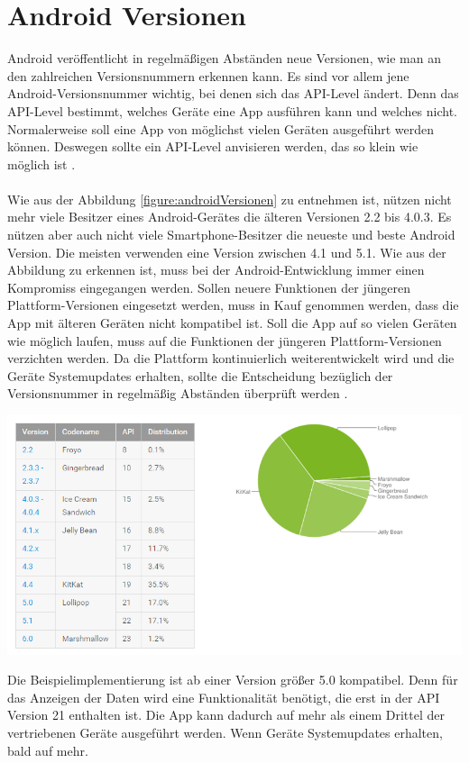 \section{Android Versionen}
Android veröffentlicht in regelmäßigen Abständen neue Versionen, wie man an den zahlreichen Versionsnummern erkennen kann. Es sind vor allem jene Android-Versionsnummer wichtig, bei denen sich das API-Level ändert. Denn das API-Level bestimmt, welches Geräte eine App ausführen kann und welches nicht. Normalerweise soll eine App von möglichst vielen Geräten ausgeführt werden können. Deswegen sollte ein API-Level anvisieren werden, das so klein wie möglich ist \cite{gargenta:einfuhrung}.
\\\\
Wie aus der Abbildung \ref{figure:androidVersionen} zu entnehmen ist, nützen nicht mehr viele Besitzer eines Android-Gerätes die älteren Versionen 2.2 bis 4.0.3. Es nützen aber auch nicht viele Smartphone-Besitzer die neueste und beste Android Version. Die meisten verwenden eine Version zwischen 4.1 und 5.1. Wie aus der Abbildung zu erkennen ist, muss bei der Android-Entwicklung 
immer einen Kompromiss eingegangen werden. Sollen neuere Funktionen der jüngeren Plattform-Versionen eingesetzt werden, muss in Kauf genommen werden, dass die App mit älteren Geräten nicht kompatibel ist. Soll die App auf so vielen Geräten wie möglich laufen, muss auf die Funktionen der jüngeren Plattform-Versionen verzichten werden. Da die Plattform kontinuierlich weiterentwickelt wird und die Geräte Systemupdates erhalten, sollte die Entscheidung bezüglich der Versionsnummer in regelmäßig Abständen überprüft werden \cite{gargenta:einfuhrung}.

\begin{minipage}{\textwidth} 
	\centering	
	\includegraphics[width=1\textwidth]{figures/android_versionen.png}
	\label{figure:androidVersionen}
	\vspace{2ex}
\end{minipage}
 
Die Beispielimplementierung ist ab einer Version größer 5.0 kompatibel. Denn für das Anzeigen der Daten wird eine Funktionalität benötigt, die erst in der API Version 21 enthalten ist. Die App kann dadurch auf mehr als einem Drittel der vertriebenen Geräte ausgeführt werden. Wenn Geräte Systemupdates erhalten, bald auf mehr.

	
	
